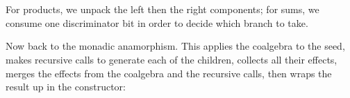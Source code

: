 \documentclass[fleqn,runningheads]{llncs}
\begin{document}
\begin{AgdaAlign}
\begin{code}
\AgdaSpace{}%
\AgdaSpace{}%
\AgdaSymbol{)}\<%
\\
%
\>[2]\AgdaSpace{}%
\AgdaSpace{}%
\AgdaSpace{}%
%
\>[25]\AgdaSymbol{=}\AgdaSpace{}%
\<%
\\
%
\>[2]\AgdaSpace{}%
\AgdaSpace{}%
\AgdaSpace{}%
%
\>[25]\AgdaSymbol{=}\AgdaSpace{}%
\<%
\end{code}
For products, we unpack the left then the right components; for sums, we consume one discriminator bit in order to decide which branch to take.

Now back to the monadic anamorphism. This applies the coalgebra to the seed, makes recursive calls to generate each of the children, collects all their effects, merges the effects from the coalgebra and the recursive calls, then wraps the result up in the constructor:
\begin{code}%
%
\>[2]\AgdaSpace{}%
\AgdaSpace{}%
\AgdaSpace{}%
\AgdaSpace{}%
\AgdaSymbol{=}\AgdaSpace{}%
\AgdaSpace{}%
\AgdaOperator{\AgdaPostulate{<\$>}}\AgdaSpace{}%
\AgdaSpace{}%
\AgdaSymbol{(}\AgdaSpace{}%
\AgdaSpace{}%
\AgdaOperator{\AgdaPostulate{<\$>}}\AgdaSpace{}%
\AgdaSymbol{(}\AgdaSpace{}%
\AgdaSpace{}%
\AgdaSpace{}%
\AgdaSymbol{(}\AgdaSpace{}%
\AgdaSpace{}%
\AgdaSymbol{)}\AgdaSpace{}%
\AgdaOperator{\AgdaPostulate{<\$>}}\AgdaSpace{}%
\AgdaSpace{}%
\AgdaSymbol{))}\<%
\end{code}
\end{AgdaAlign}
\end{document}
